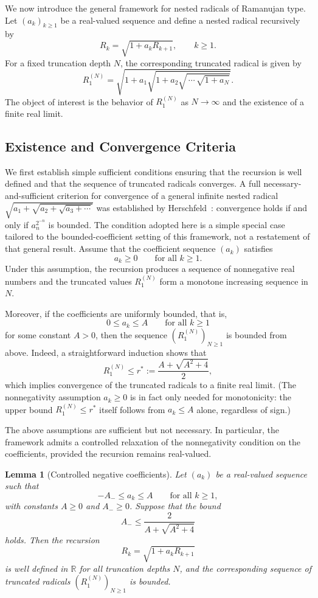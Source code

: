 \documentclass[11pt,a4paper]{amsart}
\theoremstyle{plain}
\newtheorem{lemma}[theorem]{Lemma}
\theoremstyle{definition}
\theoremstyle{remark}
\begin{document}
We now introduce the general framework for nested radicals of Ramanujan type. Let $(a_k)_{k \geq 1}$ be a real-valued sequence and define a nested radical recursively by
\[
R_k = \sqrt{1 + a_k R_{k+1}}, \qquad k \geq 1.
\]
For a fixed truncation depth $N$, the corresponding truncated radical is given by
\[
R_1^{(N)} = \sqrt{1 + a_1 \sqrt{1 + a_2 \sqrt{\,\cdots\, \sqrt{1 + a_N}}}}.
\]
The object of interest is the behavior of $R_1^{(N)}$ as $N \to \infty$ and the existence of a finite real limit.

\subsection{Existence and Convergence Criteria}
\label{subsec:existence-convergence}

We first establish simple sufficient conditions ensuring that the recursion is well defined and that the sequence of truncated radicals converges. A full necessary-and-sufficient criterion for convergence of a general infinite nested radical $\sqrt{a_1+\sqrt{a_2+\sqrt{a_3+\cdots}}}$ was established by Herschfeld~\cite{Herschfeld1935}: convergence holds if and only if $a_n^{2^{-n}}$ is bounded. The condition adopted here is a simple special case tailored to the bounded-coefficient setting of this framework, not a restatement of that general result. Assume that the coefficient sequence $(a_k)$ satisfies
\[
a_k \geq 0 \qquad \text{for all } k \geq 1.
\]
Under this assumption, the recursion produces a sequence of nonnegative real numbers and the truncated values $R_1^{(N)}$ form a monotone increasing sequence in $N$.

Moreover, if the coefficients are uniformly bounded, that is,
\[
0 \leq a_k \leq A \qquad \text{for all } k \geq 1
\]
for some constant $A > 0$, then the sequence $(R_1^{(N)})_{N \geq 1}$ is bounded from above. Indeed, a straightforward induction shows that
\[
R_1^{(N)} \leq r^{\ast} := \frac{A + \sqrt{A^2 + 4}}{2},
\]
which implies convergence of the truncated radicals to a finite real limit. (The nonnegativity assumption $a_k \ge 0$ is in fact only needed for monotonicity: the upper bound $R_1^{(N)} \le r^\ast$ itself follows from $a_k \le A$ alone, regardless of sign.)

The above assumptions are sufficient but not necessary. In particular, the framework admits a controlled relaxation of the nonnegativity condition on the coefficients, provided the recursion remains real-valued.

\begin{lemma}[Controlled negative coefficients]
\label{lem:controlled-negativity}
Let $(a_k)$ be a real-valued sequence such that
\[
-A_- \leq a_k \leq A \qquad \text{for all } k \geq 1,
\]
with constants $A \geq 0$ and $A_- \geq 0$. Suppose that the bound
\[
A_- \leq \frac{2}{A + \sqrt{A^2 + 4}}
\]
holds. Then the recursion
\[
R_k = \sqrt{1 + a_k R_{k+1}}
\]
is well defined in $\mathbb{R}$ for all truncation depths $N$, and the corresponding sequence of truncated radicals $(R_1^{(N)})_{N \geq 1}$ is bounded.
\end{lemma}
\end{document}
